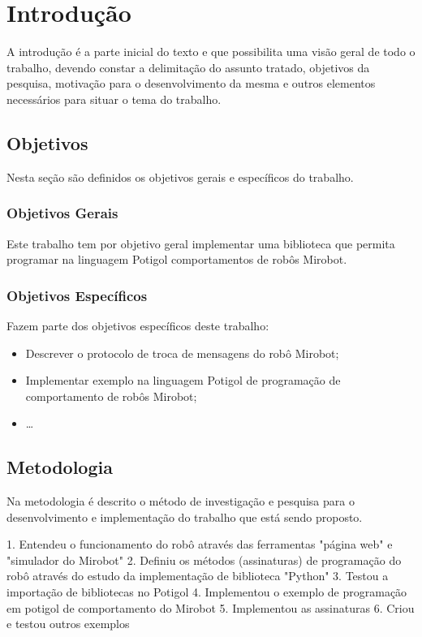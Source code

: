 \chapter{Introdução}\label{cap:introducao}

A introdução é a parte inicial do texto e que possibilita uma visão geral de
todo o trabalho, devendo constar a delimitação do assunto tratado, objetivos da
pesquisa, motivação para o desenvolvimento da mesma e outros elementos
necessários para situar o tema do trabalho.


\section{Objetivos}

Nesta seção são definidos os objetivos gerais e específicos do trabalho.


\subsection{Objetivos Gerais}

Este trabalho tem por objetivo geral implementar uma biblioteca que permita programar na linguagem Potigol comportamentos de robôs Mirobot.

\subsection{Objetivos Específicos}

Fazem parte dos objetivos específicos deste trabalho:

\begin{itemize}
  \item Descrever o protocolo de troca de mensagens do robô Mirobot;
  \item Implementar exemplo na linguagem Potigol de programação de comportamento de robôs Mirobot;
  \item \ldots
\end{itemize}


\section{Metodologia}

Na metodologia é descrito o método de investigação e pesquisa para o
desenvolvimento e implementação do trabalho que está sendo proposto.

1. Entendeu o funcionamento do robô através das ferramentas "página web" e "simulador do Mirobot"
2. Definiu os métodos (assinaturas) de programação do robô através do estudo da implementação de biblioteca "Python"
3. Testou a importação de bibliotecas no Potigol
4. Implementou o exemplo de programação em potigol de comportamento do Mirobot
5. Implementou as assinaturas
6. Criou e testou outros exemplos


